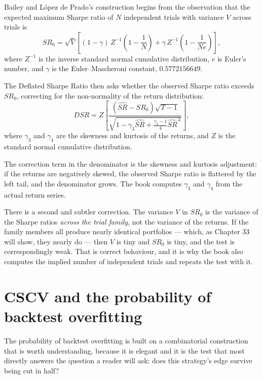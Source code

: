 Bailey and L\'opez de Prado's construction begins from the observation that
the expected maximum Sharpe ratio of \(N\) independent trials with
variance \(V\) across trials is
\begin{equation}
SR_0 = \sqrt{V}\left[(1-\gamma)\,Z^{-1}\!\left(1-\frac{1}{N}\right)
                     + \gamma\,Z^{-1}\!\left(1-\frac{1}{Ne}\right)\right],
\end{equation}
where \(Z^{-1}\) is the inverse standard normal cumulative distribution,
\(e\) is Euler's number, and \(\gamma\) is the Euler--Mascheroni constant,
\(0.5772156649\).

The Deflated Sharpe Ratio then asks whether the observed Sharpe ratio
exceeds \(SR_0\), correcting for the non-normality of the return
distribution:
\begin{equation}
DSR = Z\!\left[
  \frac{(\widehat{SR} - SR_0)\sqrt{T-1}}
       {\sqrt{1 - \gamma_3\widehat{SR}
              + \frac{\gamma_4 - 1}{4}\widehat{SR}^{\,2}}}
\right],
\end{equation}
where \(\gamma_3\) and \(\gamma_4\) are the skewness and kurtosis of the
returns, and \(Z\) is the standard normal cumulative distribution.

The correction term in the denominator is the skewness and kurtosis
adjustment: if the returns are negatively skewed, the observed Sharpe
ratio is flattered by the left tail, and the denominator grows. The book
computes \(\gamma_3\) and \(\gamma_4\) from the actual return series.

There is a second and subtler correction. The variance \(V\) in \(SR_0\)
is the variance of the Sharpe ratios \emph{across the trial family}, not
the variance of the returns. If the family members all produce nearly
identical portfolios --- which, as Chapter 33 will show, they nearly do ---
then \(V\) is tiny and \(SR_0\) is tiny, and the test is correspondingly
weak. That is correct behaviour, and it is why the book also computes the
implied number of independent trials and repeats the test with it.

\section{CSCV and the probability of backtest overfitting}

The probability of backtest overfitting is built on a combinatorial
construction that is worth understanding, because it is elegant and it is
the test that most directly answers the question a reader will ask: does
this strategy's edge survive being cut in half?

